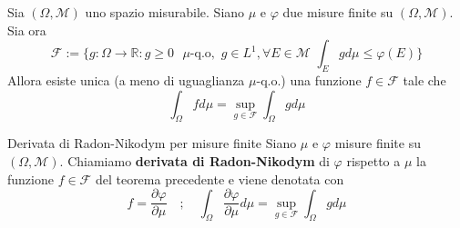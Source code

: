 \begin{theorem}\label{thm:dec_rad_nik}
    Sia \((\Omega, \mathcal{M})\) uno spazio misurabile. Siano \(\mu\) e
    \(\varphi\) due misure finite su \((\Omega, \mathcal{M})\). 
    Sia ora
    \[
        \mathcal{F} := \{g : \Omega \to \mathbb{R} : g \ge 0 \text{ \(\mu\)-q.o},\,\, g \in L^{1}, \forall E \in \mathcal{M} \,\, \int_E g d\mu \le
    \varphi(E) \} 
    \]
    Allora esiste unica (a meno di uguaglianza \(\mu\)-q.o.) una funzione \(f
    \in \mathcal{F}\) tale che \[
        \int_\Omega f d\mu = \sup_{g \in \mathcal{F}}  \int_\Omega g d\mu
    \]
\end{theorem}
\begin{definition}[label=def:rad_nik_1]{Derivata di Radon-Nikodym per misure
    finite}
    Siano \(\mu\) e \(\varphi \) misure finite su \((\Omega, \mathcal{M})\).
    Chiamiamo \textbf{derivata di Radon-Nikodym} di \(\varphi \) rispetto a
    \(\mu\) la funzione \(f \in \mathcal{F}\) del teorema precedente e viene
    denotata con
    \[
        f = \frac{\partial \varphi}{\partial \mu } \quad ;\quad \int_\Omega \frac{\partial
        \varphi}{\partial \mu } d\mu = \sup_{g \in \mathcal{F}} \int_\Omega g d\mu
    \]
\end{definition}
